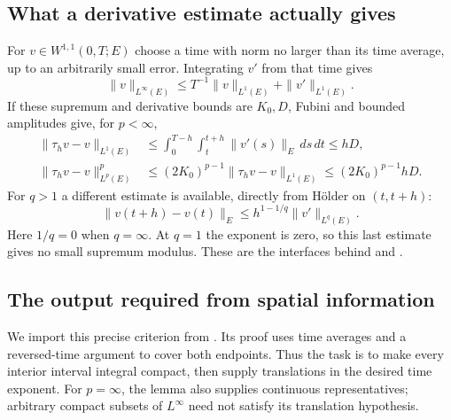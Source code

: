 \documentclass[12pt,reqno]{amsart}
\begin{document}
\subsection{What a derivative estimate actually gives}
For $v\in W^{1,1}(0,T;E)$ choose a time with norm no larger than its time average, up to an arbitrarily small error. Integrating $v'$ from that time gives
\begin{equation}\label{eq:w11}
\|v\|_{L^\infty(E)}\le T^{-1}\|v\|_{L^1(E)}+\|v'\|_{L^1(E)}.
\end{equation}
If these supremum and derivative bounds are $K_0,D$, Fubini and bounded amplitudes give, for $p<\infty$,
\begin{align}
\|\tau_hv-v\|_{L^1(E)}
&\le\int_0^{T-h}\int_t^{t+h}\|v'(s)\|_E\,ds\,dt\le hD,\label{eq:l1shift}\\
\|\tau_hv-v\|_{L^p(E)}^p
&\le(2K_0)^{p-1}\|\tau_hv-v\|_{L^1(E)}
\le(2K_0)^{p-1}hD.\label{eq:pshift}
\end{align}
For $q>1$ a different estimate is available, directly from H\"older on $(t,t+h)$:
\begin{equation}\label{eq:supshift}
\|v(t+h)-v(t)\|_E\le h^{1-1/q}\|v'\|_{L^q(E)}.
\end{equation}
Here $1/q=0$ when $q=\infty$. At $q=1$ the exponent is zero, so this last estimate gives no small supremum modulus. These are the interfaces behind \cite[Lemma 4, pp.~77--78]{S-simon} and \cite[Corollary 2.4, p.~1730]{S-maitre}.
\subsection{The output required from spatial information}
\begin{lemma}[Simon]\label{lem:criterion}

\end{lemma}
We import this precise criterion from \cite[Theorem 1, pp.~71--73]{S-simon}. Its proof uses time averages and a reversed-time argument to cover both endpoints. Thus the task is to make every interior interval integral compact, then supply translations in the desired time exponent. For $p=\infty$, the lemma also supplies continuous representatives; arbitrary compact subsets of $L^\infty$ need not satisfy its translation hypothesis.
\end{document}
